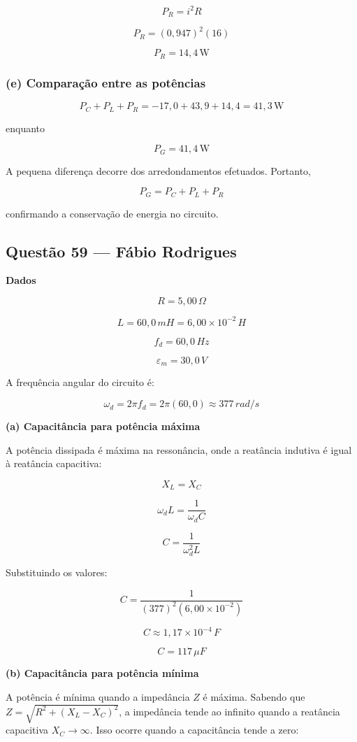 \documentclass[12pt,a4paper]{article}
\begin{document}
\[
P_R=i^2R
\]

\[
P_R=(0,947)^2(16)
\]

\[
\boxed{P_R=14,4\,\text{W}}
\]

\subsubsection*{(e) Comparação entre as potências}

\[
P_C+P_L+P_R
=
-17,0+43,9+14,4
=
41,3\,\text{W}
\]

enquanto

\[
P_G=41,4\,\text{W}
\]

A pequena diferença decorre dos arredondamentos efetuados. Portanto,

\[
\boxed{
P_G=P_C+P_L+P_R
}
\]

confirmando a conservação de energia no circuito.

\subsection{Questão 59 — Fábio Rodrigues}
\textbf{Dados}

\[
R = 5,00\,\Omega
\]

\[
L = 60,0\,mH = 6,00 \times 10^{-2}\,H
\]

\[
f_d = 60,0\,Hz
\]

\[
\varepsilon_m = 30,0\,V
\]

A frequência angular do circuito é:

\[
\omega_d = 2\pi f_d = 2\pi(60,0) \approx 377\,rad/s
\]

\textbf{(a) Capacitância para potência máxima}

A potência dissipada é máxima na ressonância, onde a reatância indutiva é igual à reatância capacitiva:

\[
X_L = X_C
\]

\[
\omega_d L = \frac{1}{\omega_d C}
\]

\[
C = \frac{1}{\omega_d^2 L}
\]

Substituindo os valores:

\[
C = \frac{1}{(377)^2 (6,00 \times 10^{-2})}
\]

\[
C \approx 1,17 \times 10^{-4}\,F
\]

\[
\boxed{C = 117\,\mu F}
\]

\textbf{(b) Capacitância para potência mínima}

A potência é mínima quando a impedância \(Z\) é máxima. Sabendo que \(Z = \sqrt{R^2 + (X_L - X_C)^2}\), a impedância tende ao infinito quando a reatância capacitiva \(X_C \to \infty\). Isso ocorre quando a capacitância tende a zero:
\end{document}
